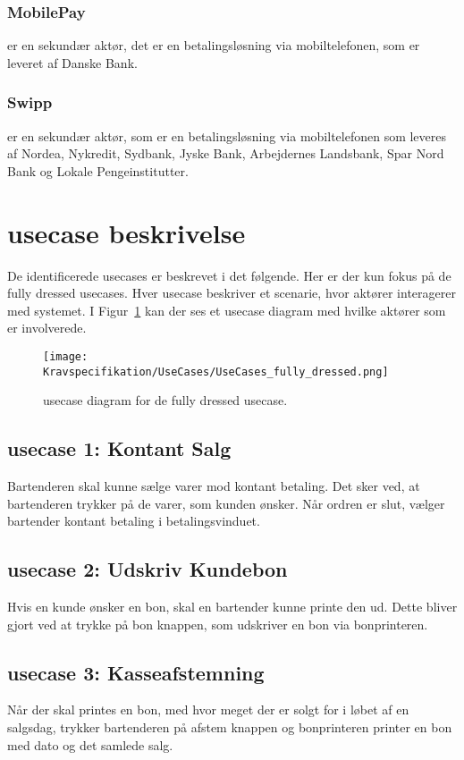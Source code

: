 \subsubsection*{MobilePay} 
er en sekundær aktør, det er en betalingsløsning via mobiltelefonen, som er leveret af Danske Bank.

\subsubsection*{Swipp} 
er en sekundær aktør, som er en betalingsløsning via mobiltelefonen som leveres af Nordea, Nykredit, Sydbank, Jyske Bank, Arbejdernes Landsbank, Spar Nord Bank og Lokale Pengeinstitutter.

\newpage

\section{\gls{usecase} beskrivelse}
De identificerede \gls{usecase}s er beskrevet i det følgende. Her er der kun fokus på de fully dressed \gls{usecase}s. Hver \gls{usecase} beskriver et scenarie, hvor aktører interagerer med systemet. I Figur~\ref{fig:fullydressedusecases} kan der ses et \gls{usecase} diagram med hvilke aktører som er involverede.

\begin{figure}[H]
	\centering
	\texttt{[image: Kravspecifikation/UseCases/UseCases\_fully\_dressed.png]}
	\caption{\gls{usecase} diagram for de fully dressed \gls{usecase}.}
	\label{fig:fullydressedusecases}
\end{figure} 

\subsection*{\gls{usecase} 1: Kontant Salg}
Bartenderen skal kunne sælge varer mod kontant betaling. Det sker ved, at bartenderen trykker på de varer, som kunden ønsker. Når ordren er slut, vælger \gls{bartender} kontant betaling i betalingsvinduet.

\subsection*{\gls{usecase} 2: Udskriv Kundebon}
Hvis en kunde ønsker en bon, skal en \gls{bartender} kunne printe den ud. Dette bliver gjort ved at trykke på bon knappen, som udskriver en bon via bonprinteren.

\subsection*{\gls{usecase} 3: Kasseafstemning}
Når der skal printes en bon, med hvor meget der er solgt for i løbet af en salgsdag, trykker bartenderen på afstem knappen og bonprinteren printer en bon med dato og det samlede salg. 

